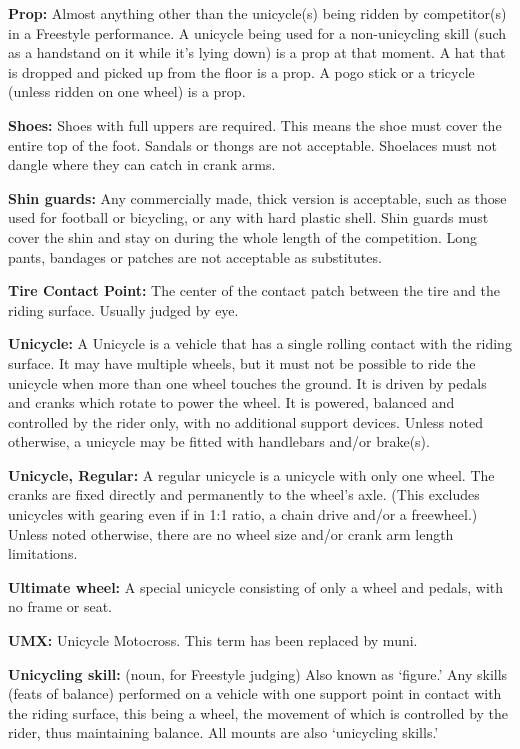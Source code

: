 \textbf{Prop:} Almost anything other than the unicycle(s) being ridden by competitor(s) in a Freestyle performance.
A unicycle being used for a non-unicycling skill (such as a handstand on it while it's lying down) is a prop at that moment.
A hat that is dropped and picked up from the floor is a prop.
A pogo stick or a tricycle (unless ridden on one wheel) is a prop.

\textbf{Shoes:} Shoes with full uppers are required.
This means the shoe must cover the entire top of the foot.
Sandals or thongs are not acceptable.
Shoelaces must not dangle where they can catch in crank arms.

\textbf{Shin guards:} Any commercially made, thick version is acceptable, such as those used for football or bicycling, or any with hard plastic shell.
Shin guards must cover the shin and stay on during the whole length of the competition.
Long pants, bandages or patches are not acceptable as substitutes.

\textbf{Tire Contact Point:} The center of the contact patch between the tire and the riding surface.
Usually judged by eye.

\textbf{Unicycle:} A Unicycle is a vehicle that has a single rolling contact with the riding surface.
It may have multiple wheels, but it must not be possible to ride the unicycle when more than one wheel touches the ground.
It is driven by pedals and cranks which rotate to power the wheel.
It is powered, balanced and controlled by the rider only, with no additional support devices.
Unless noted otherwise, a unicycle may be fitted with handlebars and/or brake(s).

\textbf{Unicycle, Regular:} A regular unicycle is a unicycle with only one wheel.
The cranks are fixed directly and permanently to the wheel's axle.
(This excludes unicycles with gearing even if in 1:1 ratio, a chain drive and/or a freewheel.)
Unless noted otherwise, there are no wheel size and/or crank arm length limitations.

\textbf{Ultimate wheel:} A special unicycle consisting of only a wheel and pedals, with no frame or seat.

\textbf{UMX:} Unicycle Motocross.
This term has been replaced by muni.

\textbf{Unicycling skill:} (noun, for Freestyle judging) Also known as `figure.' Any skills (feats of balance) performed on a vehicle with one support point in contact with the riding surface, this being a wheel, the movement of which is controlled by the rider, thus maintaining balance.
All mounts are also `unicycling skills.'

